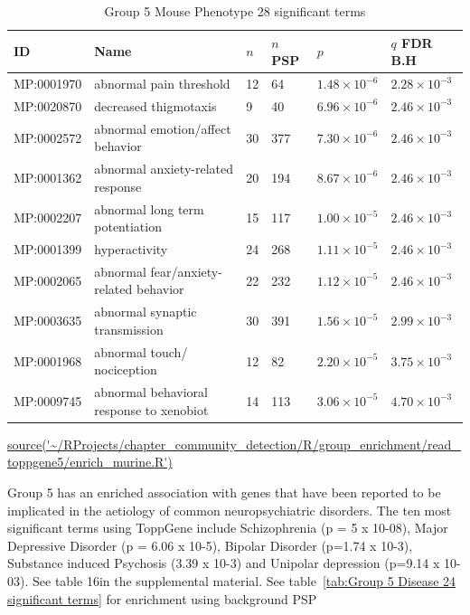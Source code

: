\begin{table}[ht]
\centering
\setlength{\extrarowheight}{2pt}
\begin{adjustbox}{width=\textwidth}
\begin{tabular}{llllll}
  \toprule
ID & Name &$n$ &$n$ PSP& $p$ & $q$ FDR B.H \\ 
  \midrule
MP:0001970 & abnormal pain threshold & 12 & 64 & $1.48 \times 10^{-6}$ & $2.28 \times 10^{-3}$ \\ 
  MP:0020870 & decreased thigmotaxis & 9 & 40 & $6.96 \times 10^{-6}$ & $2.46 \times 10^{-3}$ \\ 
  MP:0002572 & abnormal emotion/affect behavior & 30 & 377 & $7.30 \times 10^{-6}$ & $2.46 \times 10^{-3}$ \\ 
  MP:0001362 & abnormal anxiety-related response & 20 & 194 & $8.67 \times 10^{-6}$ & $2.46 \times 10^{-3}$ \\ 
  MP:0002207 & abnormal long term potentiation & 15 & 117 & $1.00 \times 10^{-5}$ & $2.46 \times 10^{-3}$ \\ 
  MP:0001399 & hyperactivity & 24 & 268 & $1.11 \times 10^{-5}$ & $2.46 \times 10^{-3}$ \\ 
  MP:0002065 & abnormal fear/anxiety-related behavior & 22 & 232 & $1.12 \times 10^{-5}$ & $2.46 \times 10^{-3}$ \\ 
  MP:0003635 & abnormal synaptic transmission & 30 & 391 & $1.56 \times 10^{-5}$ & $2.99 \times 10^{-3}$ \\ 
  MP:0001968 & abnormal touch/ nociception & 12 & 82 & $2.20 \times 10^{-5}$ & $3.75 \times 10^{-3}$ \\ 
  MP:0009745 & abnormal behavioral response to xenobiot & 14 & 113 & $3.06 \times 10^{-5}$ & $4.70 \times 10^{-3}$ \\ 
   \bottomrule
\end{tabular}
\end{adjustbox}
\caption{Group 5 Mouse Phenotype 28 significant terms}
\tiny\url{source('~/RProjects/chapter_community_detection/R/group_enrichment/read_toppgene5/enrich_murine.R')}
\label{tab:Group 5 Mouse Phenotype 28 significant terms}
\end{table}


Group 5 has an enriched association with genes that have been reported to be implicated in the aetiology of common neuropsychiatric disorders. The ten most significant terms using ToppGene \cite{chen2009toppgene}  include Schizophrenia (p = 5 x 10-08), Major Depressive Disorder (p = 6.06 x 10-5),  Bipolar Disorder (p=1.74 x 10-3), Substance induced Psychosis  (3.39 x 10-3) and Unipolar depression (p=9.14 x 10-03). See table 16in the supplemental material. See table~\ref{tab:Group 5 Disease 24 significant terms} for enrichment using background PSP

